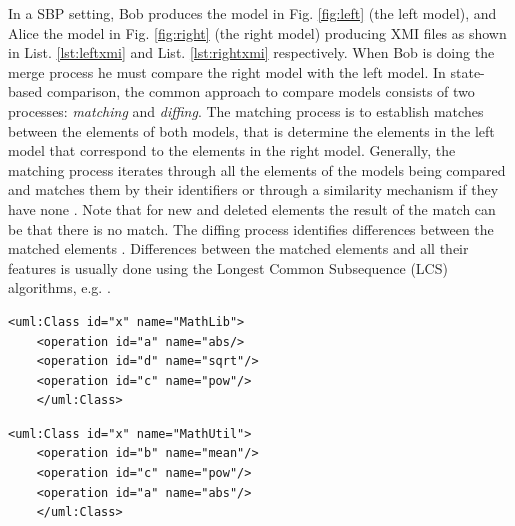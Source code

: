 \documentclass{jot}
\begin{document}
In a SBP setting, Bob produces the model in Fig. \ref{fig:left} (the left model), and Alice the model in Fig. \ref{fig:right} (the right model) producing XMI files as shown in List. \ref{lst:leftxmi} and List. \ref{lst:rightxmi} respectively.
When Bob is doing the merge process he must compare the right model with the left model.
In state-based comparison, the common approach to compare models consists of two processes: \emph{matching} and \emph{diffing}.
The matching process is to establish matches between the elements of both models, that is determine the elements in the left model that correspond to the elements in the right model.
Generally, the matching process iterates through all the elements of the models being compared and matches them by their identifiers or through a similarity mechanism if they have none \cite{DBLP:conf/sfm/BroschKLSWW12,emfcompare2018developer}.
Note that for new and deleted elements the result of the match can be that there is no match.
The diffing process identifies differences between the matched elements \cite{DBLP:conf/sfm/BroschKLSWW12,emfcompare2018developer}.
Differences between the matched elements and all their features is usually done using the Longest Common Subsequence (LCS) algorithms, e.g. \cite{DBLP:journals/algorithmica/Meyers86}.

\vspace{-10pt}
\begin{minipage}[t]{0.49\linewidth} 
    \begin{lstlisting}[style=eol,caption={The simplified XMI of the left model in Fig. \ref{fig:left}.},label=lst:leftxmi]
    <uml:Class id="x" name="MathLib">
    <operation id="a" name="abs/>
    <operation id="d" name="sqrt"/>
    <operation id="c" name="pow"/>
    </uml:Class>
    \end{lstlisting}
\end{minipage}
\hfill
\begin{minipage}[t]{0.49\linewidth}
    \begin{lstlisting}[style=eol,caption={The simplified XMI of the right model in Fig. \ref{fig:right}.},label=lst:rightxmi]
    <uml:Class id="x" name="MathUtil">
    <operation id="b" name="mean"/>
    <operation id="c" name="pow"/>
    <operation id="a" name="abs"/>
    </uml:Class>
    \end{lstlisting}
\end{minipage}
\end{document}
